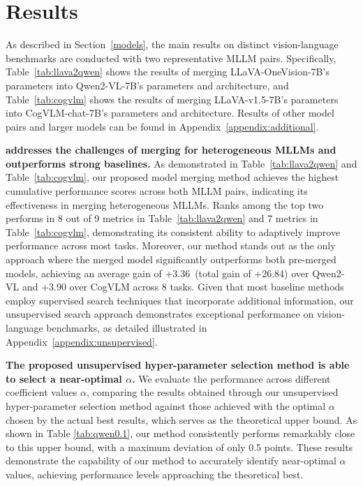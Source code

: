 \section{Results}
\label{sec:results}
% 
% 
% 




As described in Section~\ref{models}, the main results on distinct vision-language benchmarks are conducted with two representative MLLM pairs. Specifically, Table~\ref{tab:llava2qwen} shows the results of merging LLaVA-OneVision-7B's parameters into Qwen2-VL-7B's parameters and architecture, and Table~\ref{tab:cogvlm} shows the results of merging LLaVA-v1.5-7B's parameters into CogVLM-chat-7B's parameters and architecture. Results of other model pairs and larger models can be found in Appendix~\ref{appendix:additional}.

\textbf{\ours  addresses the challenges of merging for heterogeneous MLLMs and outperforms strong baselines.} As demonstrated in Table~\ref{tab:llava2qwen} and Table~\ref{tab:cogvlm}, our proposed \ours model merging method achieves the highest cumulative performance scores across both MLLM pairs, indicating its effectiveness in merging heterogeneous MLLMs. Ranks among the top two performs in 8 out of 9 metrics in Table~\ref{tab:llava2qwen} and 7 metrics in Table~\ref{tab:cogvlm}, demonstrating its consistent ability to adaptively improve performance across most tasks. 
Moreover, our method stands out as the only approach where the merged model significantly outperforms both pre-merged models, achieving an average gain of +3.36~(total gain of +26.84) over Qwen2-VL and +3.90 over CogVLM across 8 tasks.
Given that most baseline methods employ supervised search techniques that incorporate additional information, our unsupervised search approach demonstrates exceptional performance on vision-language benchmarks, as detailed illustrated in Appendix~\ref{appendix:unsupervised}. 

\textbf{The proposed unsupervised hyper-parameter selection method is able to select a near-optimal $\alpha$.} We evaluate the performance across different coefficient values $\alpha$, comparing the results obtained through our unsupervised hyper-parameter selection method against those achieved with the optimal $\alpha$ chosen by the actual best results, which serves as the theoretical upper bound. As shown in Table \ref{tab:qwen0.1}, our method consistently performs remarkably close to this upper bound, with a maximum deviation of only 0.5 points. These results demonstrate the capability of our method to accurately identify near-optimal $\alpha$ values, achieving performance levels approaching the theoretical best.

